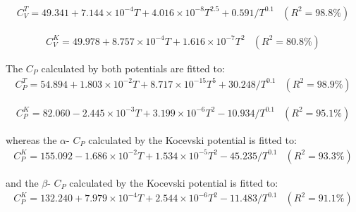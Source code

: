 \documentclass[preprint, 12pt]{elsarticle}
\begin{document}
\begin{equation}
\begin{array}{cc}
C_V^T = 49.341 + 7.144 \times 10^{-4} T + 4.016 \times 10^{-8} T^{2.5} + 0.591 / T^{0.1} & \left( R^2 = 98.8\% \right)
\label{CVADP}
\end{array}
\end{equation}

\begin{equation}
\begin{array}{cc}
C_V^K = 49.978 + 8.757 \times 10^{-4} T + 1.616 \times 10^{-7} T^2 & \left( R^2 = 80.8\% \right)
\label{CVEAM}
\end{array}
\end{equation}

The  $C_P$ calculated by both potentials are fitted to:
\begin{equation}
\begin{array}{cc}
C_P^T = 54.894 + 1.803 \times 10^{-2} T + 8.717 \times 10^{-15} T^5 + 30.248 / T^{0.1} & \left( R^2 = 98.9\% \right)
\end{array}
\label{CPUN2ADP}
\end{equation}

\begin{equation}
\begin{array}{cc}
C_P^K = 82.060 - 2.445 \times 10^{-3} T + 3.199 \times 10^{-6} T^2 - 10.934 / T^{0.1} & \left( R^2 = 95.1\% \right)
\end{array}
\label{CPUN2EAM}
\end{equation}

whereas the $\alpha$- $C_P$ calculated by the Kocevski potential is fitted to:
\begin{equation}
\begin{array}{cc}
C_P^{K} = 155.092 - 1.686 \times 10^{-2} T + 1.534 \times 10^{-5} T^2 - 45.235 / T^{0.1} & \left( R^2 = 93.3\% \right)
\end{array}
\label{CPU2N3b}
\end{equation}

and the $\beta$- $C_P$ calculated by the Kocevski potential is fitted to:
\begin{equation}
\begin{array}{cc}
C_P^{K} = 132.240 + 7.979 \times 10^{-4} T + 2.544 \times 10^{-6} T^2 - 11.483 / T^{0.1} & \left( R^2 = 91.1\% \right)
\end{array}
\label{CPU2N3}
\end{equation}
\end{document}
